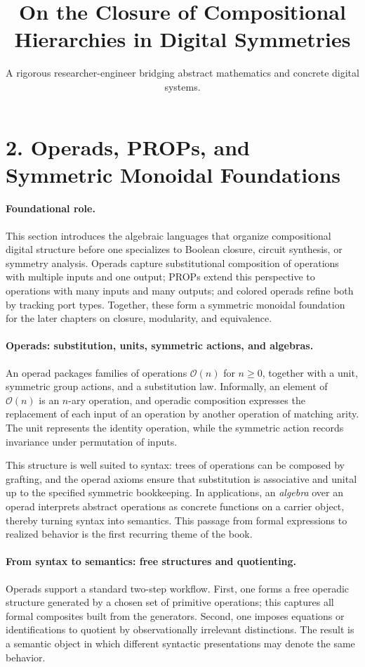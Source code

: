 \documentclass[11pt]{article}
\title{On the Closure of Compositional Hierarchies in Digital Symmetries}
\author{A rigorous researcher-engineer bridging abstract mathematics and concrete digital systems.}
\begin{document}
\section*{2. Operads, PROPs, and Symmetric Monoidal Foundations}

\paragraph{Foundational role.}
This section introduces the algebraic languages that organize compositional digital structure before one specializes to Boolean closure, circuit synthesis, or symmetry analysis. Operads capture substitutional composition of operations with multiple inputs and one output; PROPs extend this perspective to operations with many inputs and many outputs; and colored operads refine both by tracking port types. Together, these form a symmetric monoidal foundation for the later chapters on closure, modularity, and equivalence.

\paragraph{Operads: substitution, units, symmetric actions, and algebras.}
An operad packages families of operations \(\mathcal{O}(n)\) for \(n \ge 0\), together with a unit, symmetric group actions, and a substitution law. Informally, an element of \(\mathcal{O}(n)\) is an \(n\)-ary operation, and operadic composition expresses the replacement of each input of an operation by another operation of matching arity. The unit represents the identity operation, while the symmetric action records invariance under permutation of inputs.

This structure is well suited to syntax: trees of operations can be composed by grafting, and the operad axioms ensure that substitution is associative and unital up to the specified symmetric bookkeeping. In applications, an \emph{algebra} over an operad interprets abstract operations as concrete functions on a carrier object, thereby turning syntax into semantics. This passage from formal expressions to realized behavior is the first recurring theme of the book.

\paragraph{From syntax to semantics: free structures and quotienting.}
Operads support a standard two-step workflow. First, one forms a free operadic structure generated by a chosen set of primitive operations; this captures all formal composites built from the generators. Second, one imposes equations or identifications to quotient by observationally irrelevant distinctions. The result is a semantic object in which different syntactic presentations may denote the same behavior.
\end{document}

